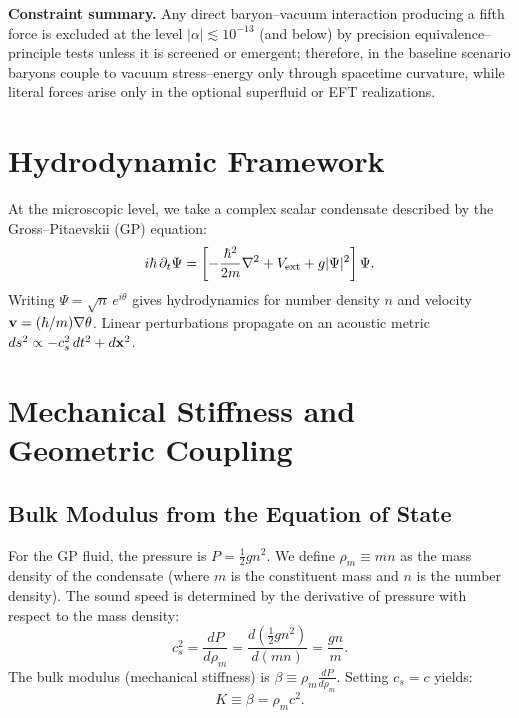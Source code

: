 \documentclass[11pt,a4paper]{article}
\begin{document}
\medskip
\noindent\textbf{Constraint summary.} Any direct baryon--vacuum interaction producing a fifth force is excluded at the level $|\alpha|\!\lesssim\!10^{-13}$ (and below) by precision equivalence–principle tests unless it is screened or emergent; therefore, in the baseline scenario baryons couple to vacuum stress--energy only through spacetime curvature, while literal forces arise only in the optional superfluid or EFT realizations.\cite{EotWashEP,AsteroidFifthForce,Jacobson1995,Gubitosi2013,BerezhianiKhoury2015}

\section{Hydrodynamic Framework}
At the microscopic level, we take a complex scalar condensate described by the Gross--Pitaevskii (GP) equation:\cite{Gross1961,Pitaevskii1961}
\begin{equation}
i\hbar\,\partial_t\Psi=\left[-\frac{\hbar^2}{2m}\nabla^2 + V_{\rm ext} + g|\Psi|^2\right]\Psi.
\end{equation}
Writing $\Psi=\sqrt{n}\,e^{i\theta}$ gives hydrodynamics for number density $n$ and velocity $\vb{v}=(\hbar/m)\nabla\theta$. Linear perturbations propagate on an acoustic metric $ds^2\propto -c_s^2\,dt^2 + d\vb{x}^2$.

\section{Mechanical Stiffness and Geometric Coupling}

\subsection{Bulk Modulus from the Equation of State}
For the GP fluid, the pressure is $P=\tfrac12 g n^2$. We define $\rho_m \equiv mn$ as the mass density of the condensate (where $m$ is the constituent mass and $n$ is the number density). The sound speed is determined by the derivative of pressure with respect to the mass density:\cite{LandauLifshitz}
\begin{equation}
c_s^2 = \frac{dP}{d\rho_m} = \frac{d(\tfrac{1}{2}gn^2)}{d(mn)} = \frac{gn}{m}.
\end{equation}
The bulk modulus (mechanical stiffness) is $\beta \equiv \rho_m \frac{dP}{d\rho_m}$. Setting $c_s=c$ yields:
\begin{equation}
K \equiv \beta = \rho_m c^2.
\end{equation}
\end{document}
